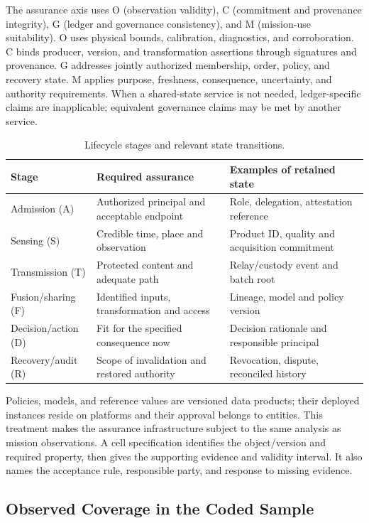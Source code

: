 The assurance axis uses O (observation validity), C (commitment and provenance integrity), G (ledger and governance consistency), and M (mission-use suitability). O uses physical bounds, calibration, diagnostics, and corroboration. C binds producer, version, and transformation assertions through signatures and provenance. G addresses jointly authorized membership, order, policy, and recovery state. M applies purpose, freshness, consequence, uncertainty, and authority requirements. When a shared-state service is not needed, ledger-specific claims are inapplicable; equivalent governance claims may be met by another service.

\begin{table}[!htb]
\caption{Lifecycle stages and relevant state transitions.\label{tab:lifecycle}}
\begin{tabularx}{\textwidth}{@{}P{35mm}YY@{}}
\toprule
\textbf{Stage} & \textbf{Required assurance} & \textbf{Examples of retained state}\\
\midrule
Admission (A) & Authorized principal and acceptable endpoint & Role, delegation, attestation reference\\
Sensing (S) & Credible time, place and observation & Product ID, quality and acquisition commitment\\
Transmission (T) & Protected content and adequate path & Relay/custody event and batch root\\
Fusion/sharing (F) & Identified inputs, transformation and access & Lineage, model and policy version\\
Decision/action (D) & Fit for the specified consequence now & Decision rationale and responsible principal\\
Recovery/audit (R) & Scope of invalidation and restored authority & Revocation, dispute, reconciled history\\
\bottomrule
\end{tabularx}
\end{table}

Policies, models, and reference values are versioned data products; their deployed instances reside on platforms and their approval belongs to entities. This treatment makes the assurance infrastructure subject to the same analysis as mission observations. A cell specification identifies the object/version and required property, then gives the supporting evidence and validity interval. It also names the acceptance rule, responsible party, and response to missing evidence.

\subsection{Observed Coverage in the Coded Sample}\label{sec:coverage}

